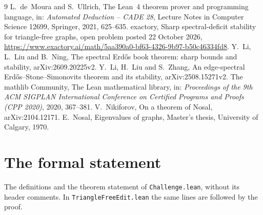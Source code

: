 \documentclass[11pt]{article}
\theoremstyle{remark}
\begin{document}
\begin{thebibliography}{9}
 L.~de~Moura and S.~Ullrich, The Lean~4 theorem prover and programming language,
  in: \emph{Automated Deduction -- CADE 28}, Lecture Notes in Computer Science 12699, Springer,
  2021, 625--635.
 exactory, Sharp spectral-deficit stability for triangle-free graphs, open
  problem posted 22 October 2026,
  \url{https://www.exactory.ai/math/5aa390a0-bf63-4326-9b97-b50c46334fd8}.
 Y.~Li, L.~Liu and B.~Ning, The spectral Erd\H{o}s book theorem: sharp bounds and
  stability, arXiv:2609.20225v2.
 Y.~Li, H.~Liu and S.~Zhang, An edge-spectral Erd\H{o}s--Stone--Simonovits theorem
  and its stability, arXiv:2508.15271v2.
 The mathlib Community, The Lean mathematical library, in: \emph{Proceedings of
  the 9th ACM SIGPLAN International Conference on Certified Programs and Proofs (CPP 2020)}, 2020,
  367--381.
 V.~Nikiforov, On a theorem of Nosal, arXiv:2104.12171.
 E.~Nosal, Eigenvalues of graphs, Master's thesis, University of Calgary, 1970.
\end{thebibliography}

\appendix
\section{The formal statement}\label{app:lean}

The definitions and the theorem statement of \texttt{Challenge.lean}, without its header
comments. In \texttt{TriangleFreeEdit.lean} the same lines are followed by the proof.
\end{document}
